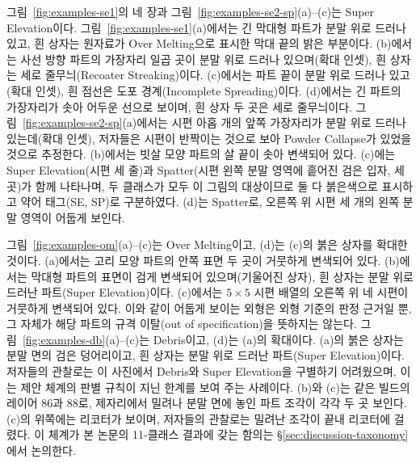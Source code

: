 그림~\ref{fig:examples-se1}의 네 장과
그림~\ref{fig:examples-se2-sp}(a)--(c)는 Super Elevation이다.
그림~\ref{fig:examples-se1}(a)에서는 긴 막대형 파트가 분말 위로 드러나
있고, 흰 상자는 원자료가 Over Melting으로 표시한 막대 끝의 밝은
부분이다. (b)에서는 사선 방향 파트의 가장자리 일곱 곳이 분말 위로
드러나 있으며(확대 인셋), 흰 상자는 세로 줄무늬(Recoater
Streaking)이다. (c)에서는 파트 끝이 분말 위로 드러나 있고(확대 인셋),
흰 점선은 도포 경계(Incomplete Spreading)이다. (d)에서는 긴 파트의
가장자리가 솟아 어두운 선으로 보이며, 흰 상자 두 곳은 세로 줄무늬이다.
그림~\ref{fig:examples-se2-sp}(a)에서는 시편 아홉 개의 앞쪽 가장자리가
분말 위로 드러나 있는데(확대 인셋), 저자들은 시편이 반짝이는 것으로
보아 Powder Collapse가 있었을 것으로 추정한다. (b)에서는 빗살 모양
파트의 살 끝이 솟아 변색되어 있다. (c)에는 Super Elevation(시편 세
줄)과 Spatter(시편 왼쪽 분말 영역에 흩어진 검은 입자, 세 곳)가 함께
나타나며, 두 클래스가 모두 이 그림의 대상이므로 둘 다 붉은색으로
표시하고 약어 태그(SE, SP)로 구분하였다. (d)는 Spatter로, 오른쪽 위
시편 세 개의 왼쪽 분말 영역이 어둡게 보인다.

그림~\ref{fig:examples-om}(a)--(c)는 Over Melting이고, (d)는 (c)의
붉은 상자를 확대한 것이다. (a)에서는 고리 모양 파트의 안쪽 표면 두
곳이 거뭇하게 변색되어 있다. (b)에서는 막대형 파트의 표면이 검게
변색되어 있으며(기울어진 상자), 흰 상자는 분말 위로 드러난 파트(Super
Elevation)이다. (c)에서는 $5 \times 5$ 시편 배열의 오른쪽 위 네 시편이
거뭇하게 변색되어 있다. 이와 같이 어둡게 보이는 외형은 외형 기준의
판정 근거일 뿐, 그 자체가 해당 파트의 규격 이탈(out of
specification)을 뜻하지는 않는다.
그림~\ref{fig:examples-db}(a)--(c)는 Debris이고, (d)는 (a)의
확대이다. (a)의 붉은 상자는 분말 면의 검은 덩어리이고, 흰 상자는 분말
위로 드러난 파트(Super Elevation)이다. 저자들의 관찰로는 이 사진에서
Debris와 Super Elevation을 구별하기 어려웠으며, 이는 제안 체계의 판별
규칙이 지닌 한계를 보여 주는 사례이다. (b)와 (c)는 같은 빌드의 레이어
86과 88로, 제자리에서 밀려나 분말 면에 놓인 파트 조각이 각각 두 곳
보인다. (c)의 위쪽에는 리코터가 보이며, 저자들의 관찰로는 밀려난
조각이 끝내 리코터에 걸렸다. 이 체계가 본 논문의 11-클래스 결과에 갖는
함의는 \S\ref{sec:discussion-taxonomy}에서 논의한다.

